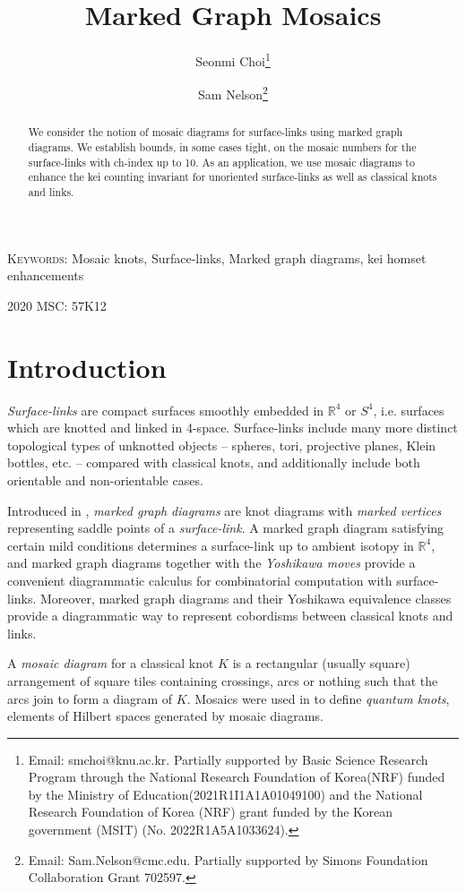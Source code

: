 \documentclass{article}
\date{}
\title{\Large \textbf{Marked Graph Mosaics}} %
\author{
Seonmi Choi\footnote{Email: smchoi@knu.ac.kr. Partially supported by Basic Science Research Program through the National Research Foundation of Korea(NRF) funded by the Ministry of Education(2021R1I1A1A01049100) and the National Research Foundation of Korea (NRF) grant funded by the Korean government (MSIT) (No. 2022R1A5A1033624). }
 \and
Sam Nelson\footnote{Email: Sam.Nelson@cmc.edu. Partially supported by
Simons Foundation Collaboration Grant 702597.}}
\theoremstyle{definition}
\begin{document}
\maketitle

\begin{abstract}
We consider the notion of mosaic diagrams for surface-links using marked
graph diagrams. We establish bounds, in some cases tight, on the mosaic
numbers for the surface-links with ch-index up to 10. As an application,
we use mosaic diagrams to enhance the kei counting invariant for unoriented 
surface-links as well as classical knots and links.
\end{abstract}


\parbox{6in} {\textsc{Keywords:} Mosaic knots, Surface-links, Marked graph diagrams, kei homset enhancements


\smallskip

\textsc{2020 MSC:} 57K12}


\section{\large\textbf{Introduction}}\label{I}

\textit{Surface-links} are compact surfaces smoothly embedded in $\mathbb{R}^4$ or $S^4$, i.e. surfaces which are knotted and linked in 4-space. Surface-links include many more distinct topological types of unknotted objects -- spheres, tori, projective planes, Klein bottles, etc. -- compared with classical knots, and additionally include both orientable and non-orientable cases.

Introduced in \cite{Lomonaco}, \textit{marked graph diagrams} are knot diagrams
with \textit{marked vertices} representing saddle points of a \textit{surface-link}.
A marked graph diagram satisfying certain mild conditions determines
a surface-link up to ambient isotopy in $\mathbb{R}^4$, and marked graph
diagrams together with the \textit{Yoshikawa moves} provide a convenient 
diagrammatic calculus for combinatorial computation with surface-links. Moreover, marked graph diagrams and their Yoshikawa equivalence classes provide a diagrammatic way to represent cobordisms between classical knots and links.

A \textit{mosaic diagram} for a classical knot $K$ is a rectangular (usually 
square)
arrangement of square tiles containing crossings, arcs or nothing 
such that the arcs join to form a diagram of $K$. Mosaics were used in 
\cite{LK} to define \textit{quantum knots}, elements of Hilbert spaces 
generated by mosaic diagrams.
\end{document}
